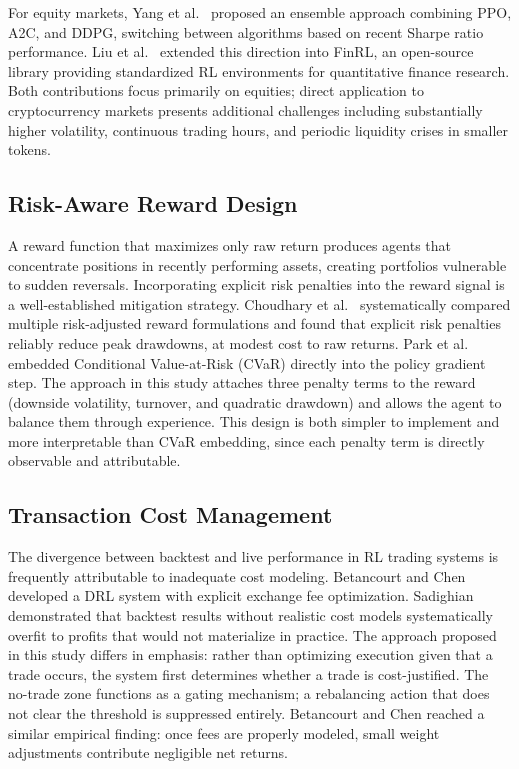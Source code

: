 \documentclass[pdflatex,sn-mathphys-num]{sn-jnl}
\begin{document}
For equity markets, Yang et al.\ \cite{yang2020deep} proposed an ensemble
approach combining PPO, A2C, and DDPG, switching between algorithms based on
recent Sharpe ratio performance. Liu et al.\ \cite{liu2022finrl} extended this
direction into FinRL, an open-source library providing standardized RL
environments for quantitative finance research. Both contributions focus
primarily on equities; direct application to cryptocurrency markets presents
additional challenges including substantially higher volatility, continuous
trading hours, and periodic liquidity crises in smaller tokens.

\subsection{Risk-Aware Reward Design}

A reward function that maximizes only raw return produces agents that concentrate
positions in recently performing assets, creating portfolios vulnerable to sudden
reversals. Incorporating explicit risk penalties into the reward signal is a
well-established mitigation strategy. Choudhary et al.\ \cite{choudhary2025risk}
systematically compared multiple risk-adjusted reward formulations and found that
explicit risk penalties reliably reduce peak drawdowns, at modest cost to raw
returns. Park et al.\ \cite{park2020risk} embedded Conditional Value-at-Risk
(CVaR) directly into the policy gradient step. The approach in this study
attaches three penalty terms to the reward (downside volatility, turnover, and
quadratic drawdown) and allows the agent to balance them through experience.
This design is both simpler to implement and more interpretable than CVaR
embedding, since each penalty term is directly observable and attributable.

\subsection{Transaction Cost Management}

The divergence between backtest and live performance in RL trading systems is
frequently attributable to inadequate cost modeling. Betancourt and Chen
\cite{betancourt2021deep} developed a DRL system with explicit exchange fee
optimization. Sadighian \cite{sadighian2019deep} demonstrated that backtest
results without realistic cost models systematically overfit to profits that
would not materialize in practice. The approach proposed in this study differs
in emphasis: rather than optimizing execution given that a trade occurs, the
system first determines whether a trade is cost-justified. The no-trade zone
functions as a gating mechanism; a rebalancing action that does not clear the
threshold is suppressed entirely. Betancourt and Chen
\cite{betancourt2021deep} reached a similar empirical finding: once fees are
properly modeled, small weight adjustments contribute negligible net returns.
\end{document}

